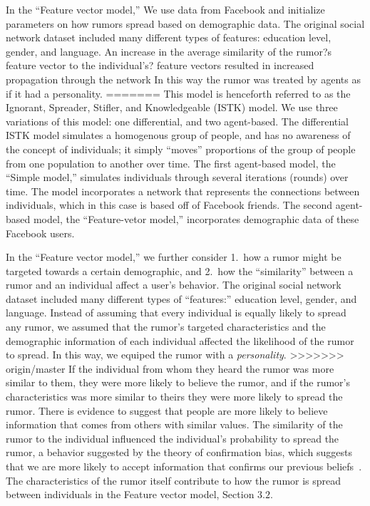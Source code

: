 In the ``Feature vector model,'' We use data from Facebook and initialize parameters on how rumors spread based on demographic data.
The original social network dataset included many different types of features: education level, gender, and language.
An increase in the average similarity of the rumor?s feature vector to the individual's? feature vectors resulted in increased propagation through the network
In this way the rumor was treated by agents as if it had a personality.
=======
This model is henceforth referred to as the Ignorant, Spreader, Stifler, and Knowledgeable (ISTK) model.
We use three variations of this model: one differential, and two agent-based.
The differential ISTK model simulates a homogenous group of people, and has no awareness of the concept of individuals; it simply ``moves'' proportions of the group of people from one population to another over time.
The first agent-based model, the ``Simple model,'' simulates individuals through several iterations (rounds) over time.
The model incorporates a network that represents the connections between individuals, which in this case is based off of Facebook friends.
The second agent-based model, the ``Feature-vetor model,'' incorporates demographic data of these Facebook users.

In the ``Feature vector model,'' we further consider 1.\ how a rumor might be targeted towards a certain demographic, and 2.\ how the ``similarity'' between a rumor and an individual affect a user's behavior.
The original social network dataset included many different types of ``features:'' education level, gender, and language.
Instead of assuming that every individual is equally likely to spread any rumor, we assumed that the rumor's targeted characteristics and the demographic information of each individual affected the likelihood of the rumor to spread.
In this way, we equiped the rumor with a \textit{personality}.
>>>>>>> origin/master
If the individual from whom they heard the rumor was more similar to them, they were more likely to believe the rumor, and if the rumor's characteristics was more similar to theirs they were more likely to spread the rumor.
There is evidence to suggest that people are more likely to believe information that comes from others with similar values\cite{gillespie-2004}.
The similarity of the rumor to the individual influenced the individual's probability to spread the rumor, a behavior suggested by the theory of confirmation bias, which suggests that we are more likely to accept information that confirms our previous beliefs~\cite{wason-1960}.
The characteristics of the rumor itself contribute to how the rumor is spread between individuals in the Feature vector model, Section $3.2$.

